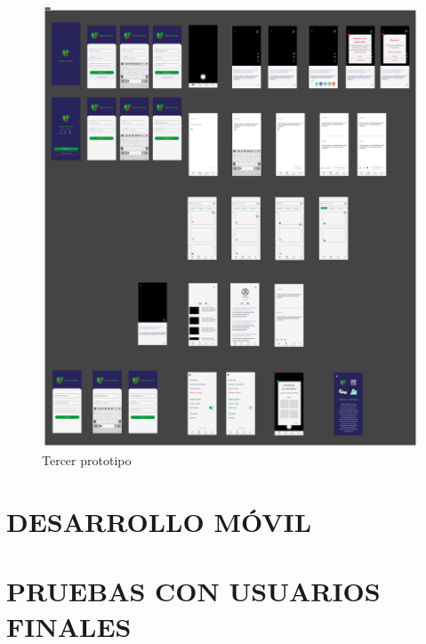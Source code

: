 \begin{itemize}
    \begin{figure} [H]
        \centering
        \includegraphics[width=1\linewidth]{figuras/segundo_prototipo.png}
        \caption{Tercer prototipo}
        \label{fig:enter-label}
    \end{figure}

\end{itemize}


\section{DESARROLLO MÓVIL}


\section{PRUEBAS CON USUARIOS FINALES}